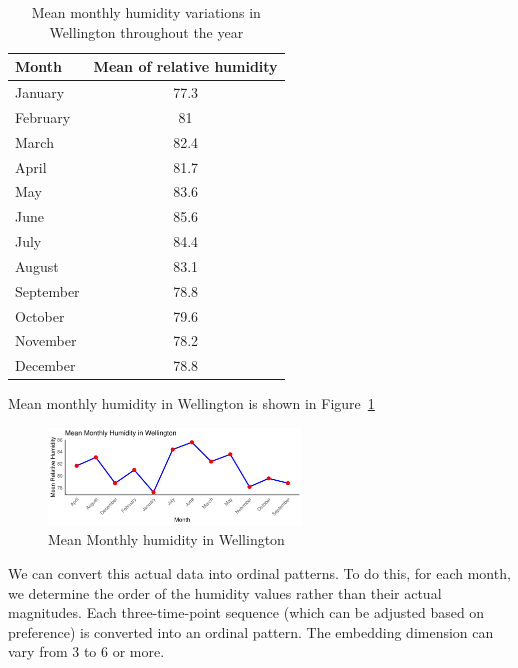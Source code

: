 \begin{table}[h]
	\centering
	\begin{tabular}{lc}
		\toprule
		 Month & Mean of relative humidity \\
		\midrule
		January & 77.3 \\ 
		February & 81 \\
		March & 82.4 \\
		April & 81.7 \\
		May & 83.6 \\ 
		June & 85.6 \\
		July & 84.4 \\
		August & 83.1 \\ 
		September & 78.8 \\
		October & 79.6 \\
		November & 78.2 \\
		December & 78.8 \\
		\bottomrule
	\end{tabular}
	\caption{Mean monthly humidity variations in Wellington throughout the year}
	\label{tab:humidity}
\end{table}

Mean monthly humidity in Wellington is shown in Figure~\ref{fig:humidity}  
\begin{figure}[hbt]
	\centering
	\includegraphics[width=0.6\textwidth]{humidity graph}
	\caption{Mean Monthly humidity in Wellington}
	\label{fig:humidity}
\end{figure}

We can convert this actual data into ordinal patterns. To do this, for each month, we determine the order of the humidity values rather than their actual magnitudes. Each three-time-point sequence (which can be adjusted based on preference) is converted into an ordinal pattern. 
The embedding dimension can vary from $3$ to $6$ or more.


